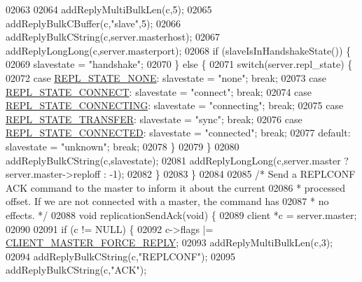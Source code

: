 \begin{DoxyCode}
{{{{{{{{{{{{{{{{{{{{{{{{{{{{{{{{{{{{{{{{{{{{{{{{{{{{{{{{{{{{{{{{{{{{{{{{{02063 
02064         addReplyMultiBulkLen(c,5);
02065         addReplyBulkCBuffer(c,\textcolor{stringliteral}{"slave"},5);
02066         addReplyBulkCString(c,server.masterhost);
02067         addReplyLongLong(c,server.masterport);
02068         \textcolor{keywordflow}{if} (slaveIsInHandshakeState()) \{
02069             slavestate = \textcolor{stringliteral}{"handshake"};
02070         \} \textcolor{keywordflow}{else} \{
02071             \textcolor{keywordflow}{switch}(server.repl\_state) \{
02072             \textcolor{keywordflow}{case} \hyperlink{server_8h_a256b9506e551eaa7417f75f8fa9ed901}{REPL\_STATE\_NONE}: slavestate = \textcolor{stringliteral}{"none"}; \textcolor{keywordflow}{break};
02073             \textcolor{keywordflow}{case} \hyperlink{server_8h_adfe013d4a620f0b98b47b2144760e69f}{REPL\_STATE\_CONNECT}: slavestate = \textcolor{stringliteral}{"connect"}; \textcolor{keywordflow}{break};
02074             \textcolor{keywordflow}{case} \hyperlink{server_8h_a5fd7ad86a4a65d6486d151151a59e9a5}{REPL\_STATE\_CONNECTING}: slavestate = \textcolor{stringliteral}{"connecting"}; \textcolor{keywordflow}{break};
02075             \textcolor{keywordflow}{case} \hyperlink{server_8h_a1d27594a2d9c8d24e4ed5a2e88d1113e}{REPL\_STATE\_TRANSFER}: slavestate = \textcolor{stringliteral}{"sync"}; \textcolor{keywordflow}{break};
02076             \textcolor{keywordflow}{case} \hyperlink{server_8h_aed693b3a9cdfc05cf5ab7551a8c86fbe}{REPL\_STATE\_CONNECTED}: slavestate = \textcolor{stringliteral}{"connected"}; \textcolor{keywordflow}{break};
02077             \textcolor{keywordflow}{default}: slavestate = \textcolor{stringliteral}{"unknown"}; \textcolor{keywordflow}{break};
02078             \}
02079         \}
02080         addReplyBulkCString(c,slavestate);
02081         addReplyLongLong(c,server.master ? server.master->reploff : -1);
02082     \}
02083 \}
02084 
02085 \textcolor{comment}{/* Send a REPLCONF ACK command to the master to inform it about the current}
02086 \textcolor{comment}{ * processed offset. If we are not connected with a master, the command has}
02087 \textcolor{comment}{ * no effects. */}
02088 \textcolor{keywordtype}{void} replicationSendAck(\textcolor{keywordtype}{void}) \{
02089     client *c = server.master;
02090 
02091     \textcolor{keywordflow}{if} (c != NULL) \{
02092         c->flags |= \hyperlink{server_8h_a291fd012c9b504c52c371e7185f0a57c}{CLIENT\_MASTER\_FORCE\_REPLY};
02093         addReplyMultiBulkLen(c,3);
02094         addReplyBulkCString(c,\textcolor{stringliteral}{"REPLCONF"});
02095         addReplyBulkCString(c,\textcolor{stringliteral}{"ACK"});
}}}}}}}}}}}}}}}}}}}}}}}}}}}}}}}}}}}}}}}}}}}}}}}}}}}}}}}}}}}}}}}}}}}}}}}}}
\end{DoxyCode}
